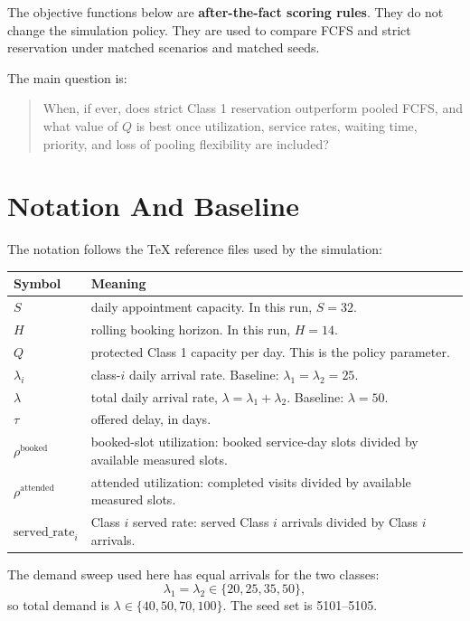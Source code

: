 \documentclass[11pt]{article}
\newcommand{\servedrate}{\mathrm{served\_rate}}
\newcommand{\bookedrho}{\rho^{\mathrm{booked}}}
\newcommand{\attendedrho}{\rho^{\mathrm{attended}}}
\begin{document}
The objective functions below are \textbf{after-the-fact scoring rules}. They do not change the
simulation policy. They are used to compare FCFS and strict reservation under matched scenarios and
matched seeds.

The main question is:

\begin{quote}
When, if ever, does strict Class 1 reservation outperform pooled FCFS, and what value of $Q$ is best
once utilization, service rates, waiting time, priority, and loss of pooling flexibility are included?
\end{quote}

\section{Notation And Baseline}

The notation follows the TeX reference files used by the simulation:

\begin{center}
\begin{tabularx}{0.92\linewidth}{@{}lX@{}}
\toprule
Symbol & Meaning \\
\midrule
$S$ & daily appointment capacity. In this run, $S=32$. \\
$H$ & rolling booking horizon. In this run, $H=14$. \\
$Q$ & protected Class 1 capacity per day. This is the policy parameter. \\
$\lambda_i$ & class-$i$ daily arrival rate. Baseline: $\lambda_1=\lambda_2=25$. \\
$\lambda$ & total daily arrival rate, $\lambda=\lambda_1+\lambda_2$. Baseline: $\lambda=50$. \\
$\tau$ & offered delay, in days. \\
$\bookedrho$ & booked-slot utilization: booked service-day slots divided by available measured slots. \\
$\attendedrho$ & attended utilization: completed visits divided by available measured slots. \\
$\servedrate_i$ & Class $i$ served rate: served Class $i$ arrivals divided by Class $i$ arrivals. \\
\bottomrule
\end{tabularx}
\end{center}

The demand sweep used here has equal arrivals for the two classes:
\[
  \lambda_1=\lambda_2 \in \{20,25,35,50\},
\]
so total demand is $\lambda \in \{40,50,70,100\}$. The seed set is 5101--5105.
\end{document}
